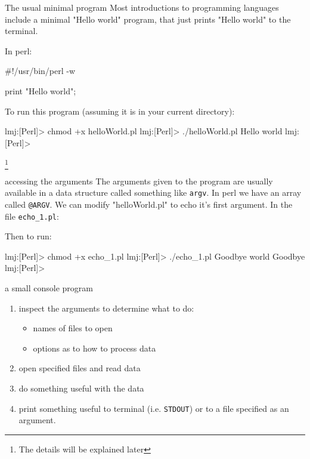 \documentclass[pdf]{beamer}
\newcommand\blfootnote[1]{%
  \begingroup  %
  \renewcommand\thefootnote{}\footnote{#1}%
  \addtocounter{footnote}{-1}  %
  \endgroup
}
\begin{document}
\begin{frame}[fragile]{The usual minimal program}
Most introductions to programming languages include a minimal "Hello world"
program, that just prints "Hello world" to the terminal.

In perl:
\begin{perlcode}
#!/usr/bin/perl -w

print "Hello world\n";
\end{perlcode}

To run this program (assuming it is in your current directory):
\begin{consolecode}
lmj:[Perl]> chmod +x helloWorld.pl 
lmj:[Perl]> ./helloWorld.pl 
Hello world
lmj:[Perl]>
\end{consolecode}  
\blfootnote{The details will be explained later}
\end{frame}

\begin{frame}[fragile]{accessing the arguments}
The arguments given to the program are usually available in a data structure
called something like \texttt{argv}. In perl we have an array called
\texttt{@ARGV}. We can modify "helloWorld.pl" to echo it's first argument. In
the file \texttt{echo\_1.pl}:


Then to run:
\begin{consolecode}
lmj:[Perl]> chmod +x echo_1.pl 
lmj:[Perl]> ./echo_1.pl Goodbye world
Goodbye
lmj:[Perl]> 
\end{consolecode}

\end{frame}

\begin{frame}{a small console program}
  \begin{enumerate}
  \item inspect the arguments to determine what to do:
    \begin{itemize}
    \item names of files to open
    \item options as to how to process data
    \end{itemize}
  \item open specified files and read data
  \item do something useful with the data
  \item print something useful to terminal (i.e. \texttt{STDOUT}) or to a file
    specified as an argument.
  \end{enumerate}
\end{frame}
\end{document}
